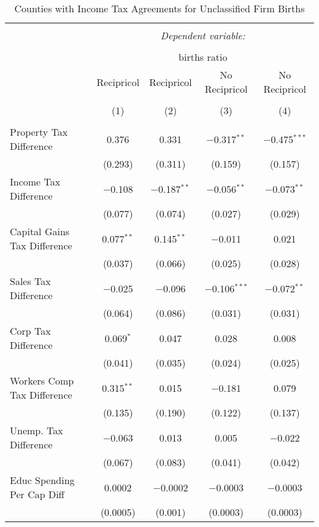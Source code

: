 
\begin{table}[!htbp] \centering 
  \caption{Counties with Income Tax Agreements for  Unclassified Firm Births} 
  \label{99rd} 
\begin{tabular}{@{\extracolsep{5pt}}lcccc} 
\\[-1.8ex]\hline 
\hline \\[-1.8ex] 
 & \multicolumn{4}{c}{\textit{Dependent variable:}} \\ 
\cline{2-5} 
\\[-1.8ex] & \multicolumn{4}{c}{births ratio} \\ 
 & Recipricol & Recipricol & No Recipricol & No Recipricol \\ 
\\[-1.8ex] & (1) & (2) & (3) & (4)\\ 
\hline \\[-1.8ex] 
 Property Tax Difference & 0.376 & 0.331 & $-$0.317$^{**}$ & $-$0.475$^{***}$ \\ 
  & (0.293) & (0.311) & (0.159) & (0.157) \\ 
  Income Tax Difference & $-$0.108 & $-$0.187$^{**}$ & $-$0.056$^{**}$ & $-$0.073$^{**}$ \\ 
  & (0.077) & (0.074) & (0.027) & (0.029) \\ 
  Capital Gains Tax Difference & 0.077$^{**}$ & 0.145$^{**}$ & $-$0.011 & 0.021 \\ 
  & (0.037) & (0.066) & (0.025) & (0.028) \\ 
  Sales Tax Difference & $-$0.025 & $-$0.096 & $-$0.106$^{***}$ & $-$0.072$^{**}$ \\ 
  & (0.064) & (0.086) & (0.031) & (0.031) \\ 
  Corp Tax Difference & 0.069$^{*}$ & 0.047 & 0.028 & 0.008 \\ 
  & (0.041) & (0.035) & (0.024) & (0.025) \\ 
  Workers Comp Tax Difference & 0.315$^{**}$ & 0.015 & $-$0.181 & 0.079 \\ 
  & (0.135) & (0.190) & (0.122) & (0.137) \\ 
  Unemp. Tax Difference & $-$0.063 & 0.013 & 0.005 & $-$0.022 \\ 
  & (0.067) & (0.083) & (0.041) & (0.042) \\ 
  Educ Spending Per Cap Diff & 0.0002 & $-$0.0002 & $-$0.0003 & $-$0.0003 \\ 
  & (0.0005) & (0.001) & (0.0003) & (0.0003) \\ 

\end{tabular}
\end{table}
